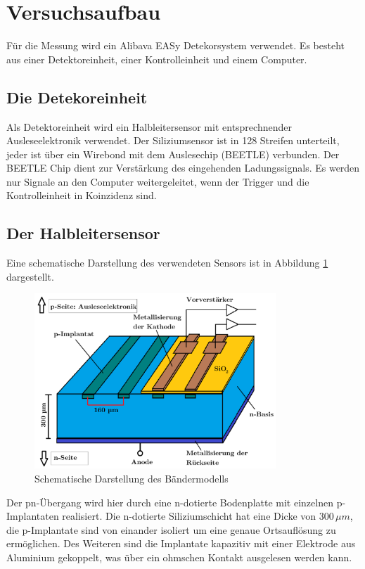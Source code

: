 \section{Versuchsaufbau}
\label{sec:Versuchaufbau}
Für die Messung wird ein Alibava EASy Detekorsystem verwendet. Es
besteht aus einer Detektoreinheit, einer
Kontrolleinheit und einem Computer.
\subsection{Die Detekoreinheit}
Als Detektoreinheit wird ein Halbleitersensor mit
entsprechnender Ausleseelektronik verwendet.
Der Siliziumsensor ist in 128 Streifen unterteilt, jeder ist über
ein Wirebond mit dem Auslesechip (BEETLE) verbunden. Der
BEETLE Chip dient zur Verstärkung des eingehenden Ladungssignals.
Es werden nur Signale an den Computer weitergeleitet, wenn der
Trigger und die Kontrolleinheit in Koinzidenz sind.\\
\subsection{Der Halbleitersensor}
Eine schematische Darstellung des verwendeten Sensors ist in Abbildung
\ref{sensor} dargestellt.
\begin{figure}[H]
  \centering
  \includegraphics[width=0.81\textwidth]{ressources/sensor.png}
  \caption{Schematische Darstellung des Bändermodells}
  \label{sensor}
\end{figure}
Der pn-Übergang wird hier durch eine n-dotierte Bodenplatte
mit einzelnen p-Implantaten realisiert. Die n-dotierte Siliziumschicht
hat eine Dicke von $300\,\mu m$, die p-Implantate sind von einander isoliert um eine
genaue Ortsauflösung zu ermöglichen. Des Weiteren sind die Implantate
kapazitiv mit einer Elektrode aus Aluminium gekoppelt, was über ein ohmschen Kontakt
ausgelesen werden kann.


